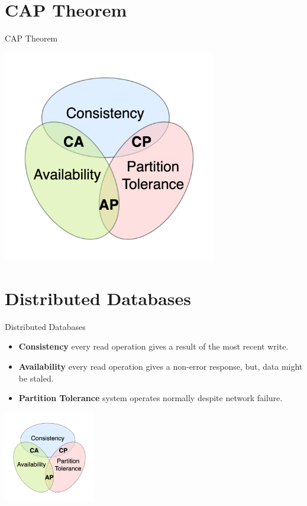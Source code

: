 \documentclass{beamer}
\begin{document}
\section{CAP Theorem}
\begin{frame}{CAP Theorem}
  \begin{center}
    \includegraphics[width=0.7\textwidth]{img/CAP_Theorem_Venn_Diagram.png}
  \end{center}
\end{frame}

\section{Distributed Databases}
\begin{frame}{Distributed Databases}
	\begin{itemize}
    		\item \textbf{Consistency} every read operation gives a result of the most recent write.
    		\item \textbf{Availability} every read operation gives a non-error response, but, data might be staled.
    		\item \textbf{Partition Tolerance} system operates normally despite network failure.
    	\end{itemize}
  \begin{center}
    \includegraphics[width=0.3\textwidth]{img/CAP_Theorem_Venn_Diagram.png}
  \end{center}
\end{frame}
\end{document}
